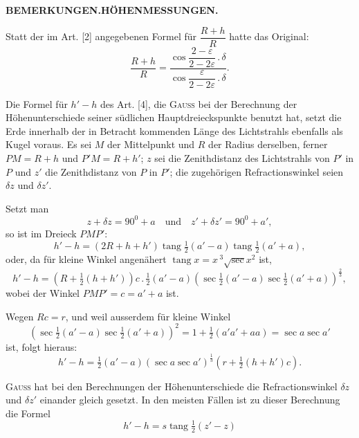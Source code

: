 \par\clearpage
\noindent\null\hfill{\small\textbf{BEMERKUNGEN.\quad HÖHENMESSUNGEN.}}\hfill{}\par\medskip
\begingroup
\footnotesize
\setlength{\abovedisplayskip}{5pt}\setlength{\belowdisplayskip}{5pt}
\par\noindent\hspace*{\parindent}Statt der im Art. [2] angegebenen Formel für
\(\dfrac{R+h}{R}\) hatte das Original:
\[
\frac{R+h}{R}=
\frac{\cos\dfrac{2-\varepsilon}{2-2\varepsilon}\mathbin{.}\delta}
     {\cos\dfrac{\varepsilon}{2-2\varepsilon}\mathbin{.}\delta}.
\]
\par\noindent\hspace*{\parindent}Die Formel für \(h'-h\) des Art. [4], die \textsc{Gauss} bei der
Berechnung der Höhenunterschiede seiner südlichen Hauptdreieckspunkte benutzt hat,
setzt die Erde innerhalb der in Betracht kommenden Länge des Lichtstrahls ebenfalls
als Kugel voraus. Es sei \(M\) der Mittelpunkt und \(R\) der Radius derselben,
ferner \(PM=R+h\) und \(P'M=R+h'\); \(z\) sei die Zenithdistanz des Lichtstrahls
von \(P'\) in \(P\) und \(z'\) die Zenithdistanz von \(P\) in \(P'\); die zugehörigen
Refractionswinkel seien \(\delta z\) und \(\delta z'\).
\par\noindent\hspace*{\parindent}Setzt man
\[
z+\delta z=90^{0}+a\quad\text{und}\quad z'+\delta z'=90^{0}+a',
\]
\noindent so ist im Dreieck \(PMP'\):
\[
h'-h=(2R+h+h')\operatorname{tang}\tfrac12(a'-a)\operatorname{tang}\tfrac12(a'+a),
\]
\noindent oder, da für kleine Winkel angenähert \(\operatorname{tang}x=x\,{}^3\!\surd\sec x^2\) ist,
\[
h'-h=(R+\tfrac12(h+h'))c\mathbin{.}\tfrac12(a'-a)
(\sec\tfrac12(a'-a)\sec\tfrac12(a'+a))^{\frac23},
\]
\noindent wobei der Winkel \(PMP'=c=a'+a\) ist.
\par\noindent\hspace*{\parindent}Wegen \(Rc=r\), und weil ausserdem für kleine Winkel
\[
(\sec\tfrac12(a'-a)\sec\tfrac12(a'+a))^2
=1+\tfrac12(a'a'+aa)=\sec a\sec a'
\]
\noindent ist, folgt hieraus:
\[
h'-h=\tfrac12(a'-a)(\sec a\sec a')^{\frac13}(r+\tfrac12(h+h')c).
\]
\par\noindent\hspace*{\parindent}\textsc{Gauss} hat bei den Berechnungen der Höhenunterschiede
die Refractionswinkel \(\delta z\) und \(\delta z'\) einander gleich gesetzt.
In den meisten Fällen ist zu dieser Berechnung die Formel
\[
h'-h=s\operatorname{tang}\tfrac12(z'-z)
\]
